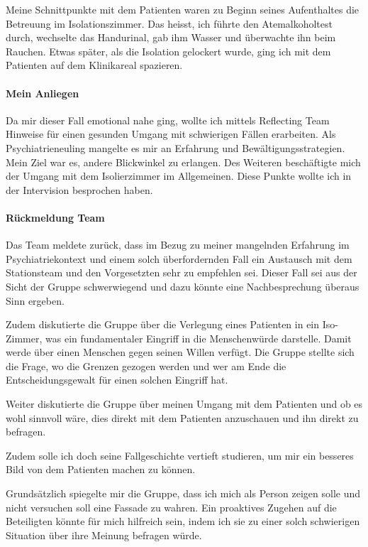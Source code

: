 Meine Schnittpunkte mit dem Patienten waren zu Beginn seines Aufenthaltes die Betreuung im Isolationszimmer. Das heisst, ich führte den Atemalkoholtest durch, wechselte das Handurinal, gab ihm Wasser und überwachte ihn beim Rauchen. Etwas später, als die Isolation gelockert wurde, ging ich mit dem Patienten auf dem Klinikareal spazieren. 

\paragraph{Mein Anliegen}
Da mir dieser Fall emotional nahe ging, wollte ich mittels Reflecting Team Hinweise für einen gesunden Umgang mit schwierigen Fällen erarbeiten. Als Psychiatrieneuling mangelte es mir an Erfahrung  und Bewältigungsstrategien. Mein Ziel war es, andere Blickwinkel zu erlangen. Des Weiteren beschäftigte mich der Umgang mit dem Isolierzimmer im Allgemeinen. Diese Punkte wollte ich in der Intervision besprochen haben. 

\paragraph{Rückmeldung Team}
Das Team meldete zurück, dass im Bezug zu meiner mangelnden Erfahrung im Psychiatriekontext und einem solch überfordernden Fall ein Austausch mit dem Stationsteam und den Vorgesetzten sehr zu empfehlen sei. Dieser Fall sei aus der Sicht der Gruppe schwerwiegend und dazu könnte eine Nachbesprechung überaus Sinn ergeben.

Zudem diskutierte die Gruppe über die Verlegung eines Patienten in ein Iso-Zimmer, was ein fundamentaler Eingriff in die Menschenwürde darstelle. Damit werde über einen Menschen gegen seinen Willen verfügt. Die Gruppe stellte sich die Frage, wo die Grenzen gezogen werden und wer am Ende die Entscheidungsgewalt für einen solchen Eingriff hat.

Weiter diskutierte die Gruppe über meinen Umgang mit dem Patienten und ob es wohl sinnvoll wäre, dies direkt mit dem Patienten anzuschauen und ihn direkt zu befragen. 

Zudem solle ich doch seine Fallgeschichte vertieft studieren, um mir ein besseres Bild von dem Patienten machen zu können.

Grundsätzlich spiegelte mir die Gruppe, dass ich mich als Person zeigen solle und nicht versuchen soll eine Fassade zu wahren. Ein proaktives Zugehen auf die Beteiligten könnte für mich hilfreich sein, indem ich sie zu einer solch schwierigen Situation über ihre Meinung befragen würde. 

